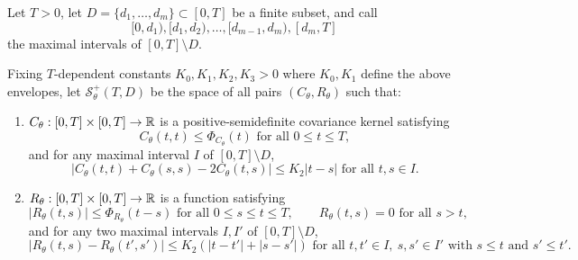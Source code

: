 \begin{definition}\label{def:S}
Let $T>0$, let $D=\{d_1,\ldots,d_m\} \subset [0,T]$ be a finite subset,
and call \[[0,d_1),[d_1,d_2),\ldots,[d_{m-1},d_m),[d_m,T]\] 
the maximal intervals of $[0,T] \setminus D$. 

Fixing $T$-dependent
constants $K_0,K_1,K_2,K_3>0$ where $K_0,K_1$ define the above envelopes,
let $\mathcal{S}_\theta^+(T,D)$ be the space of all
pairs $(C_\theta,R_\theta)$ such that:
    \begin{enumerate}
    \item $C_\theta:[0,T] \times [0,T] \to \mathbb{R}$ is a positive-semidefinite
covariance kernel satisfying
\[C_\theta(t,t) \leq \Phi_{C_\theta}(t) \text{ for all } 0\leq t\leq T,\]
and for any maximal interval $I$ of $[0,T]\setminus D$,
        \begin{equation}\label{eq:Ctheta-cont}
            |C_\theta(t,t)+C_\theta(s,s)-2C_\theta(t,s)| \leq  K_2|t-s|
\text{ for all } t,s \in I.
        \end{equation}
        \item $R_\theta:[0,T] \times [0,T] \to \mathbb{R}$ is a function satisfying
\[|R_\theta(t,s)| \leq \Phi_{R_\theta}(t-s) \text{ for all } 0 \leq s \leq t
\leq T, \qquad R_\theta(t,s)=0 \text{ for all } s>t,\]
and for any two maximal intervals $I,I'$ of $[0,T]\setminus D$,
\begin{equation}\label{eq:Rtheta-cont}
|R_\theta(t,s)-R_\theta(t',s')| \leq K_2(|t-t'|+|s-s'|) \text{ for all } t,t'\in
I,~s,s'\in I' \text{ with } s\le t \text{ and } s'\le t'.
\end{equation}
\end{enumerate}


\end{definition}
